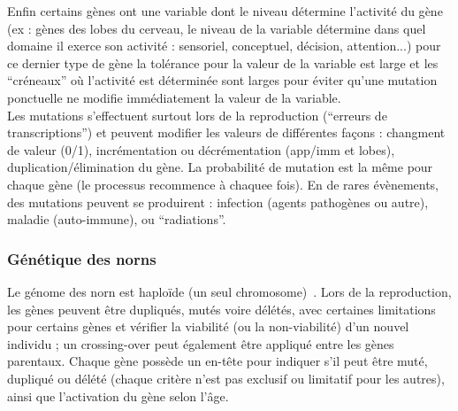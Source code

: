 \documentclass[11pt,twoside,a4paper]{article}
\begin{document}
Enfin certains g{\`e}nes ont une variable dont le niveau d{\'e}termine l'activit{\'e} du g{\`e}ne (ex : g{\`e}nes des lobes du cerveau, le niveau de la variable d{\'e}termine dans quel domaine il exerce son activit{\'e} : sensoriel, conceptuel, d{\'e}cision, attention...) pour ce dernier type de g{\`e}ne la tol{\'e}rance pour la valeur de la variable est large et les ``cr{\'e}neaux'' o{\`u} l'activit{\'e} est d{\'e}termin{\'e}e sont larges pour {\'e}viter qu'une mutation ponctuelle ne modifie imm{\'e}diatement la valeur de la variable.~\\

Les mutations s'effectuent surtout lors de la reproduction (``erreurs de transcriptions'') et peuvent modifier les valeurs de diff{\'e}rentes fa\c{c}ons : changment de valeur (0/1), incr{\'e}mentation ou d{\'e}cr{\'e}mentation (app/imm et lobes), duplication/{\'e}limination du g{\`e}ne. La probabilit{\'e} de mutation est la m{\^e}me pour chaque g{\`e}ne (le processus recommence {\`a} chaquee fois). En de rares {\'e}v{\`e}nements, des mutations peuvent se produirent : infection (agents pathog{\`e}nes ou autre), maladie (auto-immune), ou ``radiations''.~\\

\subsubsection{G{\'e}n{\'e}tique des norns}

Le g{\'e}nome des norn est haplo{\"i}de (un seul chromosome)~\cite{GraCli97}. Lors de la reproduction, les g{\`e}nes peuvent {\^e}tre dupliqu{\'e}s, mut{\'e}s voire d{\'e}l{\'e}t{\'e}s, avec certaines limitations pour certains g{\`e}nes et v{\'e}rifier la viabilit{\'e} (ou la non-viabilit{\'e}) d'un nouvel individu ; un crossing-over peut {\'e}galement {\^e}tre appliqu{\'e} entre les g{\`e}nes parentaux. Chaque g{\`e}ne poss{\`e}de un en-t{\^e}te pour indiquer s'il peut {\^e}tre mut{\'e}, dupliqu{\'e} ou d{\'e}l{\'e}t{\'e} (chaque crit{\`e}re n'est pas exclusif ou limitatif pour les autres), ainsi que l'activation du g{\`e}ne selon l'{\^a}ge.~\\

\clearpage
\end{document}

